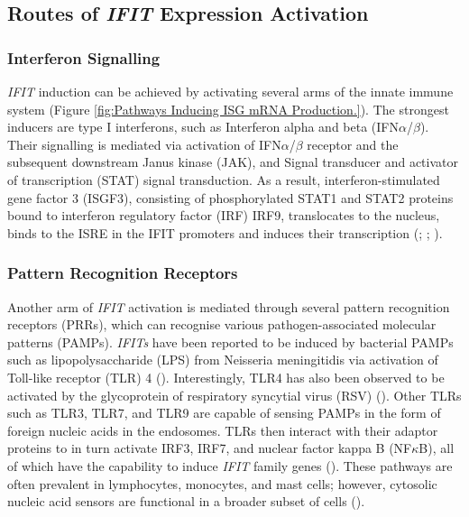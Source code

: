 \subsection{Routes of \textit{IFIT} Expression Activation} \label{subsec:Routes of IFIT Expression Activation}
\subsubsection{Interferon Signalling} \label{Interferon Signalling}
\textit{IFIT} induction can be achieved by activating several arms of the innate immune system (Figure \ref{fig:Pathways Inducing ISG mRNA Production.}). The strongest inducers are type I interferons, such as Interferon alpha and beta (IFN\(\alpha\)/\(\beta\)).  Their signalling is mediated via activation of IFN\(\alpha\)/\(\beta\) receptor and the subsequent downstream Janus kinase (JAK), and Signal transducer and activator of transcription (STAT) signal transduction. As a result, interferon-stimulated gene factor 3 (ISGF3), consisting of phosphorylated STAT1 and STAT2 proteins bound to interferon regulatory factor (IRF) IRF9, translocates to the nucleus, binds to the ISRE in the IFIT promoters and induces their transcription (\cite{Der1998IdentificationArrays}; \cite{Mesev2019DecodingInfection}; \cite{Schoggins2011Interferon-stimulatedFunctions}). 

\subsubsection{Pattern Recognition Receptors} \label{Pattern Recognition Receptors}
Another arm of \textit{IFIT} activation is mediated through several pattern recognition receptors (PRRs), which can recognise various pathogen-associated molecular patterns (PAMPs). \textit{IFITs} have been reported to be induced by bacterial PAMPs such as lipopolysaccharide (LPS) from Neisseria meningitidis via activation of Toll-like receptor (TLR) 4 (\cite{Zhou2013InterferonDefense.}). Interestingly, TLR4 has also been observed to be activated by the glycoprotein of respiratory syncytial virus (RSV) (\cite{Funchal2015RespiratoryNeutrophils}). Other TLRs such as TLR3, TLR7, and TLR9 are capable of sensing PAMPs in the form of foreign nucleic acids in the endosomes. TLRs then interact with their adaptor proteins to in turn activate IRF3, IRF7, and nuclear factor kappa B (NF\(\kappa\)B), all of which have the capability to induce \textit{IFIT} family genes (\cite{Diamond2013TheProteins}). These pathways are often prevalent in lymphocytes, monocytes, and mast cells; however, cytosolic nucleic acid sensors are functional in a broader subset of cells (\cite{Ablasser2011WhereFit}).

